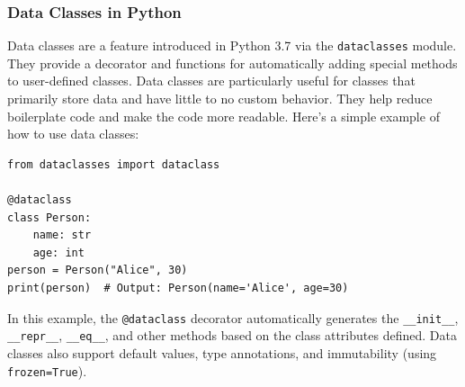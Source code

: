 \subsubsection{Data Classes in Python}
Data classes are a feature introduced in Python 3.7 via the \texttt{dataclasses} module. They provide a decorator and functions for automatically adding special methods to user-defined classes. Data classes are particularly useful for classes that primarily store data and have little to no custom behavior. They help reduce boilerplate code and make the code more readable. Here's a simple example of how to use data classes:
\begin{lstlisting}[caption=Data Class Example]
from dataclasses import dataclass

@dataclass
class Person:
    name: str
    age: int
person = Person("Alice", 30)
print(person)  # Output: Person(name='Alice', age=30)
\end{lstlisting}
In this example, the \texttt{@dataclass} decorator automatically generates the \texttt{\_\_init\_\_}, \texttt{\_\_repr\_\_}, \texttt{\_\_eq\_\_}, and other methods based on the class attributes defined. Data classes also support default values, type annotations, and immutability (using \texttt{frozen=True}).